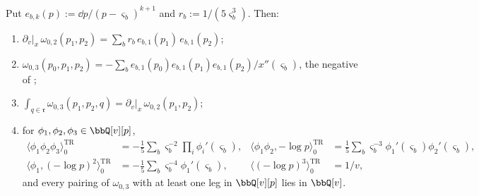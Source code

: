 \begin{lem}
\label{lem:mod-genus0}
Put $e_{b,k}(p):=\dd p/(p-\varsigma_b)^{k+1}$ and $r_b:=1/(5\varsigma_b^3)$. Then:
\begin{enumerate}
\item $\partial_v|_x\,\omega_{0,2}(p_1,p_2)=\sum_br_b\,e_{b,1}(p_1)\,e_{b,1}(p_2)$;
\item $\omega_{0,3}(p_0,p_1,p_2)=-\sum_be_{b,1}(p_0)e_{b,1}(p_1)e_{b,1}(p_2)/x''(\varsigma_b)$, the negative of \cite[Thm.~4.1 (4-20)]{Eynard:2007kz};
\item $\int_{q\in\mathfrak r}\omega_{0,3}(p_1,p_2,q)=\partial_v|_x\,\omega_{0,2}(p_1,p_2)$;
\item for $\phi_1,\phi_2,\phi_3\in\bbQ[v][p]$,
\[
\begin{aligned}
\langle\phi_1\phi_2\phi_3\rangle^{\mathrm{TR}}_0&=-\tfrac15\textstyle\sum_b\varsigma_b^{-2}\prod_i\phi_i'(\varsigma_b), &\langle\phi_1\phi_2,-\log p\rangle^{\mathrm{TR}}_0&=\tfrac15\textstyle\sum_b\varsigma_b^{-3}\phi_1'(\varsigma_b)\phi_2'(\varsigma_b),\\
\langle\phi_1,(-\log p)^2\rangle^{\mathrm{TR}}_0&=-\tfrac15\textstyle\sum_b\varsigma_b^{-4}\phi_1'(\varsigma_b), &\langle(-\log p)^3\rangle^{\mathrm{TR}}_0&=1/v,
\end{aligned}
\]
and every pairing of $\omega_{0,3}$ with at least one leg in $\bbQ[v][p]$ lies in $\bbQ[v]$.
\end{enumerate}
\end{lem}

